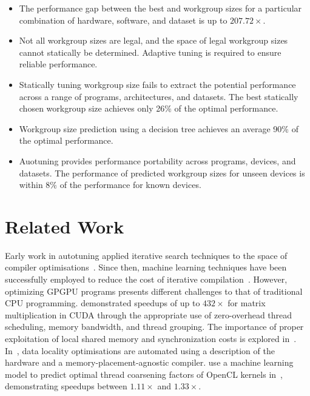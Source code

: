 \documentclass[nonatbib,preprint,nocopyrightspace,9pt]{sigplanconf}
\begin{document}
  \begin{itemize}
    \item The performance gap between the best and workgroup sizes for a
    particular combination of hardware, software, and dataset is up to
    $207.72\times$.
    \item Not all workgroup sizes are legal, and the space of legal
    workgroup sizes cannot statically be determined. Adaptive tuning is required
    to ensure reliable performance.
    \item Statically tuning workgroup size fails to extract the potential
    performance across a range of programs, architectures, and datasets. The best
    statically chosen workgroup size achieves only 26\% of the optimal
    performance.
    \item Workgroup size prediction using a decision tree achieves an
    average 90\% of the optimal performance.
    \item Auotuning provides performance portability across programs,
    devices, and datasets. The performance of predicted workgroup sizes for unseen
    devices is within 8\% of the performance for known devices.
  \end{itemize}


  \section{Related Work}\label{sec:related}

  Early work in autotuning applied iterative search techniques to the space of
  compiler optimisations~\cite{Bodin1998,Kisuki}. Since then, machine learning
  techniques have been successfully employed to reduce the cost of iterative
  compilation~\cite{Agakov,Stephenson2003,Fursin2011}. However, optimizing GPGPU
  programs presents different challenges to that of traditional CPU programming.
  \citeauthor{Ryoo2008a} demonstrated speedups of up to $432\times$ for matrix
  multiplication in CUDA through the appropriate use of zero-overhead thread
  scheduling, memory bandwidth, and thread grouping. The importance of proper
  exploitation of local shared memory and synchronization costs is explored
  in~\cite{Lee2010}. In~\cite{Chen2014}, data locality optimisations are automated
  using a description of the hardware and a memory-placement-agnostic compiler.
  \citeauthor{Magni2014} use a machine learning model to predict optimal thread
  coarsening factors of OpenCL kernels in~\cite{Magni2014}, demonstrating speedups
  between $1.11\times$ and $1.33\times$.
\end{document}
